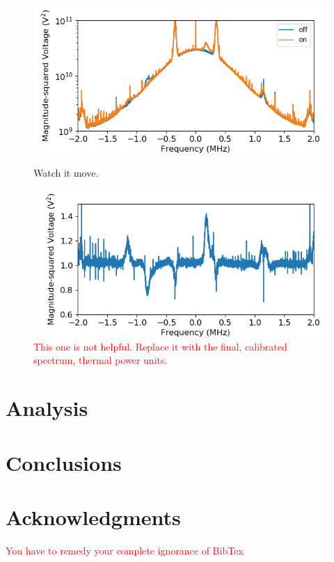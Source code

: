\documentclass[12pt]{article}
\begin{document}
\begin{figure}
\centering
\begin{minipage}{.5\textwidth}
	\centering
	\includegraphics[width=\linewidth]{up_on_off}
	\caption{Watch it move.}
	\label{fig:up_on_off}
\end{minipage}%
\begin{minipage}{.5\textwidth}
	\centering
	\includegraphics[width=\linewidth]{up_shape}
	\caption{\textcolor{red}{This one is not helpful. Replace it with the final, calibrated spectrum, thermal power units.}}
	\label{fig:up_shape}
\end{minipage}
\end{figure}



\section{Analysis}




\section{Conclusions}


\section{Acknowledgments}

\textcolor{red}{You have to remedy your complete ignorance of BibTex}
\end{document}
